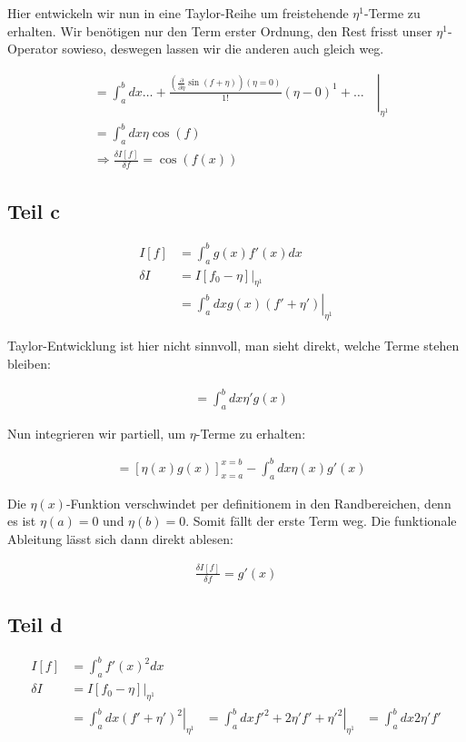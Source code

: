 \documentclass[a4paper,german,12pt,smallheadings]{scrartcl}
\begin{document}
Hier entwickeln wir nun in eine Taylor-Reihe um freistehende $\eta^1$-Terme zu
erhalten. Wir benötigen nur den Term erster Ordnung, den Rest frisst unser
$\eta^1$-Operator sowieso, deswegen lassen wir die anderen auch gleich weg.

\begin{align*}
  &=\left.\int_a^b dx \dots + \frac{\left(\frac{\partial}{\partial \eta} \sin(f+\eta)\right)(\eta=0)}{1!} (\eta - 0)^1 + \dots\quad\right|_{\eta^1} \\
  &=\int_a^b dx \eta \cos(f) \\
  &\Rightarrow \frac{\delta I[f]}{\delta f} = \cos(f(x))
\end{align*}

\subsection*{Teil c}
\begin{align*}
  I[f] &= \int_a^b g(x)f'(x) dx \\
  \delta I &= \left.I[f_0 - \eta]\right|_{\eta^1} \\
  &=\left.\int_a^b dx g(x)(f' + \eta') \right|_{\eta^1}
\end{align*}

Taylor-Entwicklung ist hier nicht sinnvoll, man sieht direkt, welche Terme stehen bleiben:

\begin{align*}
  &=\int_a^b dx \eta' g(x)
\end{align*}

Nun integrieren wir partiell, um $\eta$-Terme zu erhalten:

\begin{align*}
  &=\left[\eta(x) g(x)\right]_{x=a}^{x=b} - \int_a^b dx \eta(x) g'(x)
\end{align*}

Die $\eta(x)$-Funktion verschwindet per definitionem in den Randbereichen, denn
es ist $\eta(a) = 0$ und $\eta(b) = 0$. Somit fällt der erste Term weg. Die
funktionale Ableitung lässt sich dann direkt ablesen:

\begin{align*}
  \frac{\delta I[f]}{\delta f} = g'(x)
\end{align*}

\subsection*{Teil d}
\begin{align*}
  I[f] &= \int_a^b f'(x)^2 dx \\
  \delta I &= \left.I[f_0 - \eta]\right|_{\eta^1} \\
  &=\left.\int_a^b dx (f' + \eta')^2 \right|_{\eta^1}
  &=\left.\int_a^b dx f'^2 + 2\eta'f' + \eta'^2 \right|_{\eta^1}
  &=\int_a^b dx 2\eta'f'
\end{align*}
\end{document}
